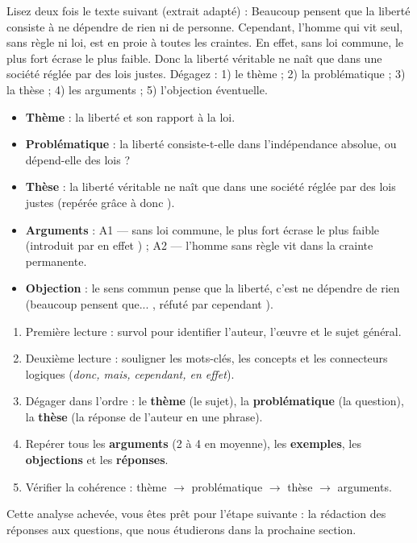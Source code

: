 \documentclass[11pt]{article}
\begin{document}
\begin{exercice}
Lisez deux fois le texte suivant (extrait adapté) : \og Beaucoup pensent que la liberté consiste à ne dépendre de rien ni de personne. Cependant, l'homme qui vit seul, sans règle ni loi, est en proie à toutes les craintes. En effet, sans loi commune, le plus fort écrase le plus faible. Donc la liberté véritable ne naît que dans une société réglée par des lois justes. \fg{}
Dégagez : 1) le thème ; 2) la problématique ; 3) la thèse ; 4) les arguments ; 5) l'objection éventuelle.
\end{exercice}

\begin{corrige}
\begin{itemize}
\item \textbf{Thème} : la liberté et son rapport à la loi.
\item \textbf{Problématique} : la liberté consiste-t-elle dans l'indépendance absolue, ou dépend-elle des lois ?
\item \textbf{Thèse} : la liberté véritable ne naît que dans une société réglée par des lois justes (repérée grâce à \og donc \fg{}).
\item \textbf{Arguments} : A1 --- sans loi commune, le plus fort écrase le plus faible (introduit par \og en effet \fg{}) ; A2 --- l'homme sans règle vit dans la crainte permanente.
\item \textbf{Objection} : le sens commun pense que la liberté, c'est ne dépendre de rien (\og beaucoup pensent que... \fg{}, réfuté par \og cependant \fg{}).
\end{itemize}
\end{corrige}

\begin{aretenir}
\begin{enumerate}
\item Première lecture : survol pour identifier l'auteur, l'œuvre et le sujet général.
\item Deuxième lecture : souligner les mots-clés, les concepts et les connecteurs logiques (\emph{donc, mais, cependant, en effet}).
\item Dégager dans l'ordre : le \textbf{thème} (le sujet), la \textbf{problématique} (la question), la \textbf{thèse} (la réponse de l'auteur en une phrase).
\item Repérer tous les \textbf{arguments} (2 à 4 en moyenne), les \textbf{exemples}, les \textbf{objections} et les \textbf{réponses}.
\item Vérifier la cohérence : thème $\rightarrow$ problématique $\rightarrow$ thèse $\rightarrow$ arguments.
\end{enumerate}
Cette analyse achevée, vous êtes prêt pour l'étape suivante : la rédaction des réponses aux questions, que nous étudierons dans la prochaine section.
\end{aretenir}
\end{document}
